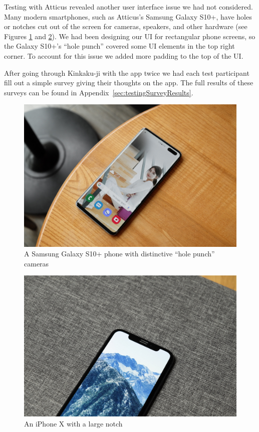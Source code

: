 \documentclass[a4paper, 10pt, american, titlepage]{article}
\begin{document}
Testing with Atticus revealed another user interface issue we had not
considered.  Many modern smartphones, such as Atticus's Samsung Galaxy S10+,
have holes or notches cut out of the screen for cameras, speakers, and other
hardware (see Figures \ref{fig:galaxyS10Plus} and \ref{fig:iPhoneX}). We had
been designing our UI for rectangular phone screens, so the Galaxy S10+'s ``hole
punch'' covered some UI elements in the top right corner. To account for this
issue we added more padding to the top of the UI.

After going through Kinkaku-ji with the app twice we had each test participant
fill out a simple survey giving their thoughts on the app. The full results of
these surveys can be found in Appendix~\ref{sec:testingSurveyResults}.

\begin{figure}[h]
	\centering
	\includegraphics[width=\textwidth]{galaxy-s10+.jpg}
	\caption[A Samsung Galaxy S10+ phone with distinctive ``hole punch''
	cameras]{A Samsung Galaxy S10+ phone with distinctive ``hole punch''
		cameras~\autocite{yoo2019}}
	\label{fig:galaxyS10Plus}
\end{figure}

\begin{figure}[h]
	\centering
	\includegraphics[width=\textwidth]{iphone-x.jpg}
	\caption[An iPhone X with a large notch]{An iPhone X with a large
		notch~\autocite{yoo2017}}
	\label{fig:iPhoneX}
\end{figure}
\end{document}
